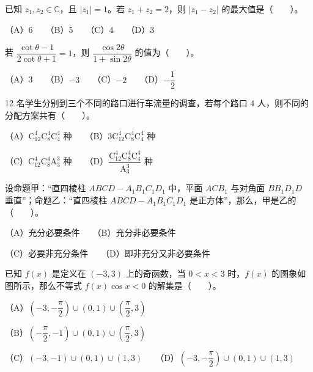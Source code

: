 \begin{question}
已知 \(z_1,z_2\in\mathbb C\)，且 \(|z_1|=1\)。若 \(z_1+z_2=2\)，则 \(|z_1-z_2|\) 的最大值是\mbox{（　　）}。

（A）6　　（B）5　　（C）4　　（D）3

\end{question}
\begin{question}
若 \(\dfrac{\cot\theta-1}{2\cot\theta+1}=1\)，则 \(\dfrac{\cos2\theta}{1+\sin2\theta}\) 的值为\mbox{（　　）}。

（A）3　　（B）\(-3\)　　（C）\(-2\)　　（D）\(-\dfrac12\)

\end{question}
\begin{question}
12 名学生分别到三个不同的路口进行车流量的调查，若每个路口 4 人，则不同的分配方案共有\mbox{（　　）}。

（A）\(\mathrm C_{12}^{4}\mathrm C_8^{4}\mathrm C_4^{4}\) 种　　（B）\(3\mathrm C_{12}^{4}\mathrm C_8^{4}\mathrm C_4^{4}\) 种

（C）\(\mathrm C_{12}^{4}\mathrm C_8^{4}\mathrm A_3^{3}\) 种　　（D）\(\dfrac{\mathrm C_{12}^{4}\mathrm C_8^{4}\mathrm C_4^{4}}{\mathrm A_3^{3}}\) 种

\end{question}
\begin{question}
设命题甲：“直四棱柱 \(ABCD-A_1B_1C_1D_1\) 中，平面 \(ACB_1\) 与对角面 \(BB_1D_1D\) 垂直”；命题乙：“直四棱柱 \(ABCD-A_1B_1C_1D_1\) 是正方体”，那么，甲是乙的\mbox{（　　）}。

（A）充分必要条件　　（B）充分非必要条件

（C）必要非充分条件　　（D）即非充分又非必要条件

\Needspace{0.4\textheight}
\end{question}
\begin{question}
已知 \(f(x)\) 是定义在 \((-3,3)\) 上的奇函数，当 \(0<x<3\) 时，\(f(x)\) 的图象如图所示，那么不等式 \(f(x)\cos x<0\) 的解集是\mbox{（　　）}。
\nopagebreak[4]
\begin{center}\end{center}
\nopagebreak[4]
（A）\(\left(-3,-\dfrac\pi2\right)\cup(0,1)\cup\left(\dfrac\pi2,3\right)\)

（B）\(\left(-\dfrac\pi2,-1\right)\cup(0,1)\cup\left(\dfrac\pi2,3\right)\)

（C）\((-3,-1)\cup(0,1)\cup(1,3)\)　　（D）\(\left(-3,-\dfrac\pi2\right)\cup(0,1)\cup(1,3)\)

\Needspace{0.4\textheight}
\end{question}
